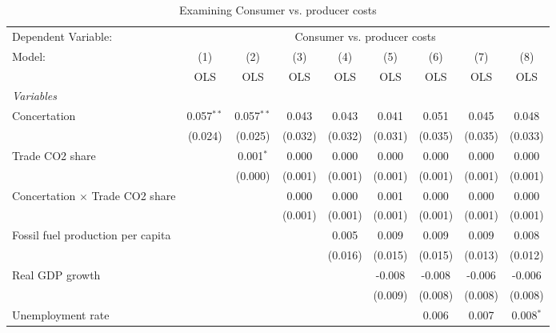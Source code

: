 
\begin{table}[htbp]
   \caption{Examining Consumer vs. producer costs}
   \centering
   \begin{tabular}{lcccccccc}
      \toprule
      Dependent Variable: & \multicolumn{8}{c}{Consumer vs. producer costs}\\
      Model:                                  & (1)          & (2)          & (3)     & (4)     & (5)     & (6)     & (7)     & (8)\\  
                                              &  OLS         & OLS          & OLS     & OLS     & OLS     & OLS     & OLS     & OLS\\  
      \midrule
      \emph{Variables}\\
      Concertation                            & 0.057$^{**}$ & 0.057$^{**}$ & 0.043   & 0.043   & 0.041   & 0.051   & 0.045   & 0.048\\   
                                              & (0.024)      & (0.025)      & (0.032) & (0.032) & (0.031) & (0.035) & (0.035) & (0.033)\\   
      Trade CO2 share                         &              & 0.001$^{*}$  & 0.000   & 0.000   & 0.000   & 0.000   & 0.000   & 0.000\\   
                                              &              & (0.000)      & (0.001) & (0.001) & (0.001) & (0.001) & (0.001) & (0.001)\\   
      Concertation $\times$ Trade CO2 share   &              &              & 0.000   & 0.000   & 0.001   & 0.000   & 0.000   & 0.000\\   
                                              &              &              & (0.001) & (0.001) & (0.001) & (0.001) & (0.001) & (0.001)\\   
      Fossil fuel production per capita       &              &              &         & 0.005   & 0.009   & 0.009   & 0.009   & 0.008\\   
                                              &              &              &         & (0.016) & (0.015) & (0.015) & (0.013) & (0.012)\\   
      Real GDP growth                         &              &              &         &         & -0.008  & -0.008  & -0.006  & -0.006\\   
                                              &              &              &         &         & (0.009) & (0.008) & (0.008) & (0.008)\\   
      Unemployment rate                       &              &              &         &         &         & 0.006   & 0.007   & 0.008$^{*}$\\   

\end{tabular}
\end{table}
